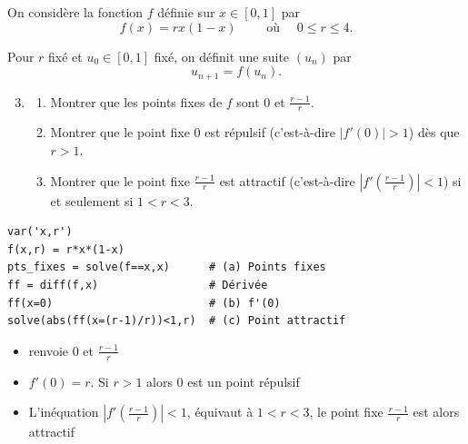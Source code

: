 \begin{frame}
\begin{tp}
On considère la fonction $f$ définie sur $x \in [0,1]$ par 
$$f(x)=rx(1-x) \qquad \text{ où } \quad 0 \le  r \le 4.$$

Pour $r$ fixé et $u_0 \in [0,1]$ fixé, on définit une suite $(u_n)$ par
$$u_{n+1} = f(u_n).$$

\begin{enumerate}
\setcounter{enumi}{2} 
\item \begin{enumerate}
    \item Montrer que les points fixes de $f$ sont $0$ et $\frac{r-1}{r}$.
    \item Montrer que le point fixe $0$ est répulsif (c'est-à-dire $|f'(0)|>1$) dès que $r>1$.
    \item Montrer que le point fixe $\frac{r-1}{r}$ est attractif (c'est-à-dire $|f'(\frac{r-1}{r})|<1$)
    si et seulement si $1< r < 3$. 
  \end{enumerate}  

  \end{enumerate}
\end{tp}
\end{frame}


\begin{frame}[fragile]
    
\begin{algo}
\begin{lstlisting}
var('x,r')
f(x,r) = r*x*(1-x)
pts_fixes = solve(f==x,x)      # (a) Points fixes
ff = diff(f,x)                 # Dérivée
ff(x=0)                        # (b) f'(0)
solve(abs(ff(x=(r-1)/r))<1,r)  # (c) Point attractif
\end{lstlisting}
\end{algo}
 
% 
% 
% 
\pause
    \begin{itemize}
    \item {} renvoie $0$ et $\frac{r-1}{r}$
    \pause
    \item $f'(0)=r$. Si $r>1$ alors $0$ est un point répulsif
    \pause
    \item L'inéquation $|f'(\frac{r-1}{r})|<1$, équivaut à $1<r<3$, 
    le point fixe $\frac{r-1}{r}$ est alors attractif
  \end{itemize} 

\end{frame}

